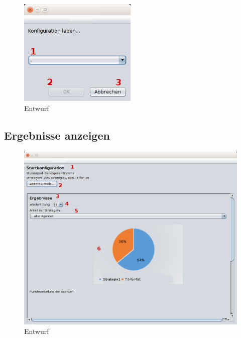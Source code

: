 \begin{figure}[htbp] 
  \centering
     \includegraphics[width=0.5\textwidth]{GUI_Entwurf/KonfigLaden.png}
  \caption{Entwurf}
  \label{fig:Bild1}
\end{figure}



\subsection{Ergebnisse anzeigen}

\begin{figure}[htbp] 
  \centering
     \includegraphics[width=1.2\textwidth]{GUI_Entwurf/Ergebnisfenster1.png}
  \caption{Entwurf}
  \label{fig:Bild1}
\end{figure}


